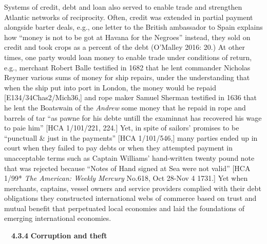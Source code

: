 \begin{styleStandard}
Systems of credit, debt and loan also served to enable trade and strengthen Atlantic networks of reciprocity. Often, credit was extended in partial payment alongside barter deals, e.g., one letter to the British ambassador to Spain explains how “money is not to be got at Havana for the Negroes” instead, they sold on credit and took crops as a percent of the debt (O’Malley 2016: 20.) At other times, one party would loan money to enable trade under conditions of return, e.g., merchant Robert Balle testified in 1682 that he lent commander Nicholas Reymer various sums of money for ship repairs, under the understanding that when the ship put into port in London, the money would be repaid [E134/34Chas2/Mich36,] and rope maker Samuel Sherman testified in 1636 that he lent the Boatswain of the \textit{Andrew} some money that he repaid in rope and barrels of tar “as pawne for his debte untill the examinnat has recovered his wage to paie him” [HCA 1/101/221, 224.] Yet, in spite of sailors’ promises to be “punctuall \& just in the payments” [HCA 1/101/546,] many parties ended up in court when they failed to pay debts or when they attempted payment in unacceptable terms such as Captain Williams’ hand-written twenty pound note that was rejected because “Notes of Hand signed at Sea were not valid” [HCA 1/99* \textit{The American: Weekly Mercury} No.618, Oct 28-Nov 4 1731.] Yet when merchants, captains, vessel owners and service providers complied with their debt obligations they constructed international webs of commerce based on trust and mutual benefit that perpetuated local economies and laid the foundations of emerging international economies. 
\end{styleStandard}

\begin{styleStandard}
\ \ \textbf{4.3.4} \textbf{Corruption and theft}
\end{styleStandard}

